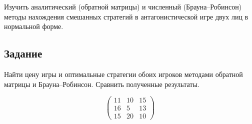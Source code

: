 
Изучить аналитический (обратной матрицы) и численный (Брауна--Робинсон) методы нахождения смешанных стратегий в антагонистической игре двух лиц в нормальной форме.

\subsection*{Задание}

Найти цену игры и оптимальные стратегии обоих игроков методами обратной матрицы и Брауна--Робинсон. Сравнить полученные результаты.

\[
\begin{pmatrix}
11 & 10 & 15 \\
16 & 5 & 13 \\
15 & 20 & 10
\end{pmatrix}
\]
